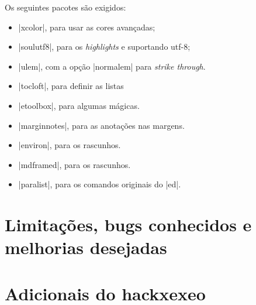\documentclass{article}
\begin{document}
    Os seguintes pacotes são exigidos:
    \begin{itemize}
        \item |xcolor|, para usar as cores avançadas;
        \item |soulutf8|, para os \textit{highlights} e suportando utf-8;
        \item |ulem|, com a opção |normalem| para \textit{strike through}.
        \item |tocloft|, para definir as listas
        \item |etoolbox|, para algumas mágicas.
        \item |marginnotes|, para as anotações nas margens.
        \item |environ|, para os rascunhos.
        \item |mdframed|, para os rascunhos.
        \item |paralist|, para os comandos originais do |ed|.
    \end{itemize}
    
    
    \section{Limitações, bugs conhecidos e melhorias desejadas}
    
    
    \printbibliography
    
    \newpage
    \section*{Adicionais do hackxexeo}
    \printhacksxexeoversion
    \newpage
    \listofassunto
    \newpage
    \listofcomentario
    \newpage
    \listofcomentarioref   
    
\end{document}
